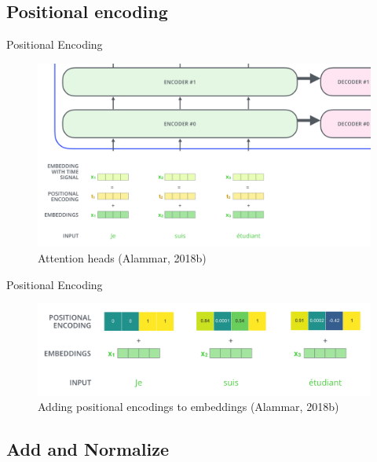 \documentclass[10pt]{beamer}
\begin{document}
\subsection{Positional encoding}

\begin{frame}{Positional Encoding}

\begin{figure}[h]
\centering
\includegraphics[width=1\textwidth]{fig/alammar_transformer_positional_encoding_vectors.png}
\caption{Attention heads (Alammar, 2018b)}
\end{figure}

\end{frame}

\begin{frame}{Positional Encoding}

\begin{figure}[h]
\centering
\includegraphics[width=1\textwidth]{fig/alammar_transformer_positional_encoding_example.png}
\caption{Adding positional encodings to embeddings (Alammar, 2018b)}
\end{figure}

\end{frame}

\subsection{Add and Normalize}
\end{document}
